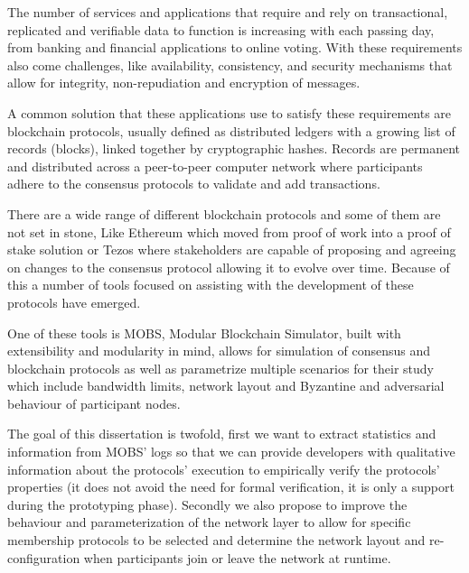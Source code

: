 
%

The number of services and applications that require and rely on transactional, replicated and verifiable data to 
function is increasing with each passing day, from banking and financial applications to online voting. With these
requirements also come challenges, like availability, consistency, and security mechanisms that allow for integrity, non-repudiation and
encryption of messages.

A common solution that these applications use to satisfy these requirements are blockchain protocols, usually defined as
distributed ledgers with a growing list of records (blocks), linked together by cryptographic hashes. Records are permanent and
distributed across a peer-to-peer computer network where participants adhere to the consensus protocols to validate and add
transactions.

There are a wide range of different blockchain protocols and some of them are not set in stone, Like Ethereum which moved from proof of work
into a proof of stake solution or Tezos where stakeholders are capable of proposing and agreeing on changes to the consensus protocol allowing
it to evolve over time. Because of this a number of tools focused on assisting with the development of these protocols have emerged.

One of these tools is MOBS, Modular Blockchain Simulator, built with extensibility and
modularity in mind, allows for simulation of consensus and blockchain protocols as well as parametrize multiple scenarios for their study which
include bandwidth limits, network layout and Byzantine and adversarial behaviour of participant nodes.

The goal of this dissertation is twofold, first we want to extract statistics and information from MOBS' logs so that we can provide
developers with qualitative information about the protocols' execution to empirically verify the protocols' properties
(it does not avoid the need for formal verification, it is only a support during the prototyping phase). 
Secondly we also propose to improve the
behaviour and parameterization of the network layer to allow for specific membership protocols to be selected and determine
the network layout and re-configuration when participants join or leave the network at runtime.


